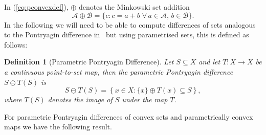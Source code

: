 \documentclass[letterpaper, 10pt, conference]{ieeeconf/ieeeconf} %
\newtheorem{defn}[thm]{Definition}
\begin{document}
In (\ref{eq:pconvexdef}), $\oplus$ denotes the Minkowski set addition
      \begin{equation}
        \mathcal A\oplus\mathcal B = \{c : c = a + b\; \forall\,a\in\mathcal A,\, b\in\mathcal B\}.
      \end{equation}
    In the following we will need to be able to compute differences of sets
    analogous to the Pontryagin difference in~\cite{Kolmanovsky:1998} but using parametrised 
    sets, this is defined as follows:

    \begin{defn}[Parametric Pontryagin Difference]\label{def:parametric:pontryagin:difference}
Let $S\subseteq X$ and let $T:X\to X$ be a continuous point-to-set map,
then the \emph{parametric Pontryagin difference} $S\ominus T(S)$ is 
      \begin{equation}
        S\ominus T(S) = \left\{x\in X: \{x\} \oplus T(x)\subseteq S\right\},
      \end{equation}
      where $T(S)$ denotes the image of $S$ under the map $T$.
    \end{defn}

    For parametric Pontryagin differences of convex sets and parametrically convex maps we have the following result.
\end{document}

